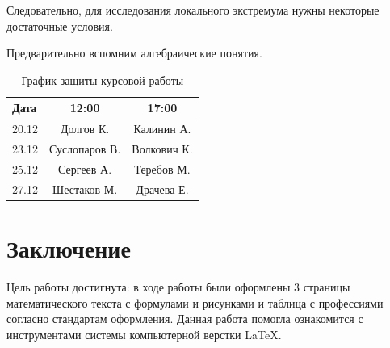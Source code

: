 Следовательно, для исследования локального экстремума нужны некоторые достаточные условия.

Предварительно вспомним алгебраические понятия. \cite{litlink1}


\begin{table}[H]
	\caption{График защиты курсовой работы}
	\begin{center}
		\begin{tabular*}{0.4\textwidth}{@{\extracolsep{\fill} } lcc}
			\toprule
			Дата & 12:00 & 17:00 \\
			\midrule
			20.12       & Долгов К.   & Калинин А.   \\
			23.12       & Суслопаров В.    & Волкович К.    \\
			25.12     & Сергеев А.   & Теребов М.   \\
			27.12      & Шестаков М.   & Драчева Е.    \\
			\bottomrule
		\end{tabular*}
		\label{tabular:tab_examp_1}
	\end{center}
\end{table}


\newpage
\section*{Заключение}

Цель работы достигнута: в ходе работы были оформлены  3 страницы математического текста с формулами и рисунками и таблица с профессиями согласно стандартам оформления. Данная работа помогла ознакомится с инструментами системы компьютерной верстки LaTeX.

